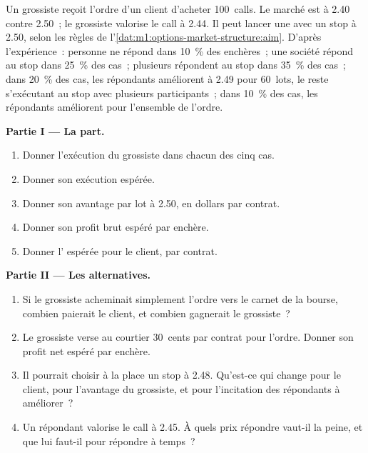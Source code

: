 \begin{problem}\label{pb:m1:options-market-structure:1}
Un grossiste reçoit l'ordre d'un client d'acheter 100~calls. Le marché est à 2.40
contre 2.50~; le grossiste valorise le call à 2.44. Il peut lancer une
 avec un stop à 2.50, selon les règles de
l'\cref{dat:m1:options-market-structure:aim}. D'après l'expérience~: personne ne répond
dans 10~\% des enchères~; une société répond au stop dans 25~\% des cas~; plusieurs
répondent au stop dans 35~\% des cas~; dans 20~\% des cas, les répondants améliorent à 2.49 pour 60~lots, le reste
s'exécutant au stop avec plusieurs participants~; dans 10~\% des cas, les répondants améliorent pour
l'ensemble de l'ordre.

\medskip\noindent\textbf{Partie I --- La part.}
\begin{enumerate}
\item Donner l'exécution du grossiste dans chacun des cinq cas.
\item Donner son exécution espérée.
\item Donner son avantage par lot à 2.50, en dollars par contrat.
\item Donner son profit brut espéré par enchère.
\item Donner l' espérée pour le client, par contrat.
\end{enumerate}

\medskip\noindent\textbf{Partie II --- Les alternatives.}
\begin{enumerate}[resume]
\item Si le grossiste acheminait simplement l'ordre vers le carnet de la bourse,
combien paierait le client, et combien gagnerait le grossiste~?
\item Le grossiste verse au courtier 30~cents par contrat pour l'ordre.
Donner son profit net espéré par enchère.
\item Il pourrait choisir à la place un stop à 2.48. Qu'est-ce qui change pour le client,
pour l'avantage du grossiste, et pour l'incitation des répondants à améliorer~?
\item Un répondant valorise le call à 2.45. À quels prix répondre vaut-il la peine,
et que lui faut-il pour répondre à temps~?
\end{enumerate}


\end{problem}
